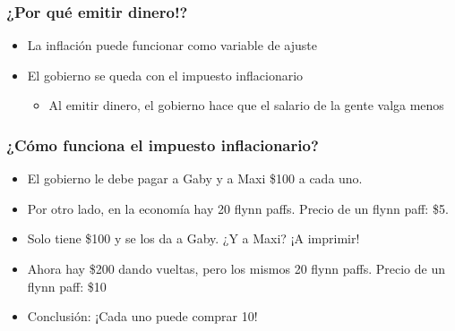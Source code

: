 \documentclass{beamer}
\begin{document}

\begin{frame}
\frametitle{¿Por qué emitir dinero!?}
\begin{itemize}
    \item La inflación puede funcionar como variable de ajuste \vspace{2mm}
    \item El gobierno se queda con el impuesto inflacionario
    \begin{itemize}
        \item Al emitir dinero, el gobierno hace que el salario de la gente valga menos
    \end{itemize}
\end{itemize}
\end{frame}

\begin{frame}
\frametitle{¿Cómo funciona el impuesto inflacionario?}
\begin{itemize}
    \item El gobierno le debe pagar a Gaby y a Maxi \$100 a cada uno. 
    \item Por otro lado, en la economía hay 20 flynn paffs. Precio de un flynn paff: \$5.
    \item Solo tiene \$100 y se los da a Gaby. ¿Y a Maxi? ¡A imprimir!
    \item Ahora hay \$200 dando vueltas, pero los mismos 20 flynn paffs. Precio de un flynn paff: \$10
    \item Conclusión: ¡Cada uno puede comprar 10!
\end{itemize}
\end{frame}

\end{document}
